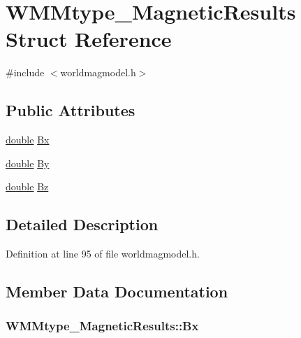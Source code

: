\hypertarget{struct_w_m_mtype___magnetic_results}{\section{W\-M\-Mtype\-\_\-\-Magnetic\-Results Struct Reference}
\label{struct_w_m_mtype___magnetic_results}
}


{\ttfamily \#include $<$worldmagmodel.\-h$>$}

\subsection*{Public Attributes}
\begin{DoxyCompactItemize}
\item 
\hyperlink{_super_l_u_support_8h_a8956b2b9f49bf918deed98379d159ca7}{double} \hyperlink{struct_w_m_mtype___magnetic_results_ae80af48fa6b9a867ae9557912556d0d8}{Bx}
\item 
\hyperlink{_super_l_u_support_8h_a8956b2b9f49bf918deed98379d159ca7}{double} \hyperlink{struct_w_m_mtype___magnetic_results_a6286c091a759e02d19c27d928e391eff}{By}
\item 
\hyperlink{_super_l_u_support_8h_a8956b2b9f49bf918deed98379d159ca7}{double} \hyperlink{struct_w_m_mtype___magnetic_results_a7b18c4cd4a4e446b117fff1f842cee83}{Bz}
\end{DoxyCompactItemize}


\subsection{Detailed Description}


Definition at line 95 of file worldmagmodel.\-h.



\subsection{Member Data Documentation}
\hypertarget{struct_w_m_mtype___magnetic_results_ae80af48fa6b9a867ae9557912556d0d8}{
\subsubsection[{Bx}]{ W\-M\-Mtype\-\_\-\-Magnetic\-Results\-::\-Bx}}\label{struct_w_m_mtype___magnetic_results_ae80af48fa6b9a867ae9557912556d0d8}


